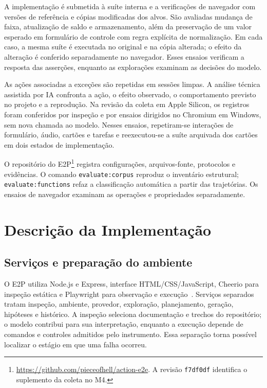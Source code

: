 \documentclass[12pt]{article}
\begin{document}
A implementação é submetida à suíte interna e a verificações de navegador com versões de referência e cópias modificadas dos alvos. São avaliadas mudança de faixa, atualização de saldo e armazenamento, além da preservação de um valor esperado em formulário de controle com regra explícita de normalização. Em cada caso, a mesma suíte é executada no original e na cópia alterada; o efeito da alteração é conferido separadamente no navegador. Esses ensaios verificam a resposta das asserções, enquanto as explorações examinam as decisões do modelo.

As ações associadas a exceções são repetidas em sessões limpas. A análise técnica assistida por IA confronta a ação, o efeito observado, o comportamento previsto no projeto e a reprodução. Na revisão da coleta em Apple Silicon, os registros foram conferidos por inspeção e por ensaios dirigidos no Chromium em Windows, sem nova chamada ao modelo. Nesses ensaios, repetiram-se interações de formulário, áudio, cartões e tarefas e reexecutou-se a suíte arquivada dos cartões em dois estados de implementação.

O repositório do E2P\footnote{\url{https://github.com/pieceofhell/action-e2e}. A revisão \texttt{f7df0df} identifica o suplemento da coleta no M4.} registra configurações, arquivos-fonte, protocolos e evidências. O comando \texttt{evaluate:corpus} reproduz o inventário estrutural; \texttt{evaluate:functions} refaz a classificação automática a partir das trajetórias. Os ensaios de navegador examinam as operações e propriedades separadamente.


\section{Descrição da Implementação}\label{sec:implementation}
\subsection{Serviços e preparação do ambiente}
O E2P utiliza Node.js e Express, interface HTML/CSS/JavaScript, Cheerio para inspeção estática e Playwright para observação e execução~\cite{microsoft2026playwright}. Serviços separados tratam inspeção, ambiente, provedor, exploração, planejamento, geração, hipóteses e histórico. A inspeção seleciona documentação e trechos do repositório; o modelo contribui para sua interpretação, enquanto a execução depende de comandos e controles admitidos pelo instrumento. Essa separação torna possível localizar o estágio em que uma falha ocorreu.
\end{document}
